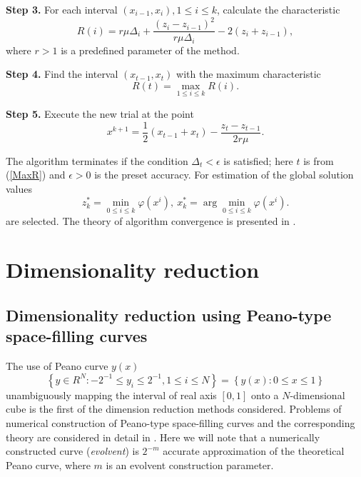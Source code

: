 \documentclass[runningheads]{llncs}
\begin{document}
\textbf{Step 3.} For each interval $(x_{i-1},x_i),1\leq i\leq k$,  calculate 
the characteristic
\begin{equation}\label{R}
R(i)=r\mu\Delta_i+\frac{(z_i-z_{i-1})^2}{r\mu\Delta_i}-2(z_i+z_{i-1}),
\end{equation} 
where $r>1$ is a predefined parameter of the method. 

\textbf{Step 4.} Find the interval $(x_{t-1},x_t)$ with the maximum 
characteristic
\begin{equation}\label{MaxR}
R(t)=\max_{1\leq i\leq {k}}R(i).
\end{equation}  

\textbf{Step 5.} Execute the new trial at the point 
\begin{equation}\label{xk1}
x^{k+1}=\frac{1}{2}(x_{t-1}+x_t) - \frac{z_t-z_{t-1}}{2r\mu}.
\end{equation}

The algorithm terminates if the condition $\Delta_t<\epsilon$ is satisfied; 
here $t$ is from (\ref{MaxR}) and $\epsilon>0$ is the preset accuracy. For 
estimation of the global solution values
\[
z_k^\ast=\min_{0\leq i \leq k}\varphi(x^i), \ x_k^\ast=\arg \min_{0\leq i \leq
 k}\varphi(x^i).
\]
are selected. 
The theory of algorithm convergence is presented in \cite{Strongin2000}.

\section{Dimensionality reduction}
\subsection{Dimensionality reduction using Peano-type space-filling curves}
\label{SectionPeano}

The use of Peano curve $y(x)$ 
\begin{equation}
\left\{y\in R^N: -2^{-1}\leq y_i \leq 2^{-1}, 1 \leq i \leq N\right\}=\left\{
y(x):0\leq x \leq 1 \right\}
\end{equation}
unambiguously mapping the interval of real axis $[0,1]$ onto a 
$N$-dimensional cube is the first of the dimension reduction methods considered.
Problems of numerical construction of Peano-type space-filling curves and the 
corresponding theory are considered in detail in 
\cite{Sergeyev2013,Strongin2000}. Here we will note that a numerically 
constructed curve (\textit{evolvent}) is $2^{-m}$ accurate approximation of 
the theoretical Peano curve, where $m$ is an evolvent construction parameter.
\end{document}
